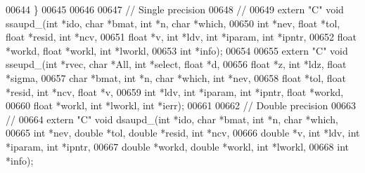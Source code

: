 \begin{DoxyCode}
00644 \}
00645 
00646 
00647 \textcolor{comment}{// Single precision}
00648 \textcolor{comment}{//}
00649 \textcolor{keyword}{extern} \textcolor{stringliteral}{"C"} \textcolor{keywordtype}{void} ssaupd\_(\textcolor{keywordtype}{int} *ido, \textcolor{keywordtype}{char} *bmat, \textcolor{keywordtype}{int} *n, \textcolor{keywordtype}{char} *which,
00650     \textcolor{keywordtype}{int} *nev, \textcolor{keywordtype}{float} *tol, \textcolor{keywordtype}{float} *resid, \textcolor{keywordtype}{int} *ncv,
00651     \textcolor{keywordtype}{float} *v, \textcolor{keywordtype}{int} *ldv, \textcolor{keywordtype}{int} *iparam, \textcolor{keywordtype}{int} *ipntr,
00652     \textcolor{keywordtype}{float} *workd, \textcolor{keywordtype}{float} *workl, \textcolor{keywordtype}{int} *lworkl,
00653     \textcolor{keywordtype}{int} *info);
00654 
00655 \textcolor{keyword}{extern} \textcolor{stringliteral}{"C"} \textcolor{keywordtype}{void} sseupd\_(\textcolor{keywordtype}{int} *rvec, \textcolor{keywordtype}{char} *All, \textcolor{keywordtype}{int} *select, \textcolor{keywordtype}{float} *d,
00656     \textcolor{keywordtype}{float} *z, \textcolor{keywordtype}{int} *ldz, \textcolor{keywordtype}{float} *sigma, 
00657     \textcolor{keywordtype}{char} *bmat, \textcolor{keywordtype}{int} *n, \textcolor{keywordtype}{char} *which, \textcolor{keywordtype}{int} *nev,
00658     \textcolor{keywordtype}{float} *tol, \textcolor{keywordtype}{float} *resid, \textcolor{keywordtype}{int} *ncv, \textcolor{keywordtype}{float} *v,
00659     \textcolor{keywordtype}{int} *ldv, \textcolor{keywordtype}{int} *iparam, \textcolor{keywordtype}{int} *ipntr, \textcolor{keywordtype}{float} *workd,
00660     \textcolor{keywordtype}{float} *workl, \textcolor{keywordtype}{int} *lworkl, \textcolor{keywordtype}{int} *ierr);
00661 
00662 \textcolor{comment}{// Double precision}
00663 \textcolor{comment}{//}
00664 \textcolor{keyword}{extern} \textcolor{stringliteral}{"C"} \textcolor{keywordtype}{void} dsaupd\_(\textcolor{keywordtype}{int} *ido, \textcolor{keywordtype}{char} *bmat, \textcolor{keywordtype}{int} *n, \textcolor{keywordtype}{char} *which,
00665     \textcolor{keywordtype}{int} *nev, \textcolor{keywordtype}{double} *tol, \textcolor{keywordtype}{double} *resid, \textcolor{keywordtype}{int} *ncv,
00666     \textcolor{keywordtype}{double} *v, \textcolor{keywordtype}{int} *ldv, \textcolor{keywordtype}{int} *iparam, \textcolor{keywordtype}{int} *ipntr,
00667     \textcolor{keywordtype}{double} *workd, \textcolor{keywordtype}{double} *workl, \textcolor{keywordtype}{int} *lworkl,
00668     \textcolor{keywordtype}{int} *info);

\end{DoxyCode}
